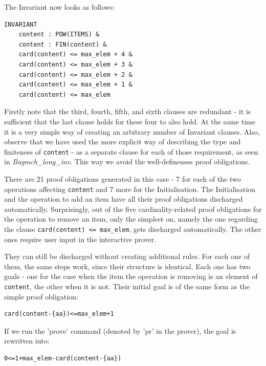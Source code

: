 \documentclass[11pt,journal]{IEEEtran}
\begin{document}
	The Invariant now looks as follows:
	\begin{lstlisting}
INVARIANT
	content : POW(ITEMS) & 
	content : FIN(content) &
	card(content) <= max_elem + 4 &
	card(content) <= max_elem + 3 &
	card(content) <= max_elem + 2 &
	card(content) <= max_elem + 1 &
	card(content) <= max_elem
	\end{lstlisting}
	Firstly note that the third, fourth, fifth, and sixth clauses are redundant - it is sufficient that the last clause holds for these four to also hold. At the same time it is a very simple way of creating an arbitrary number of Invariant clauses. Also, observe that we have used the more explicit way of describing the type and finiteness of \texttt{content} - as a separate clause for each of those requirement, as seen in \emph{Bagmch\_long\_inv}. This way we avoid the well-defineness proof obligations.
	
	There are 21 proof obligations generated in this case - 7 for each of the two operations affecting \texttt{content} and 7 more for the Initialisation. The Initialisation and the operation to add an item have all their proof obligations discharged automatically. Surprisingly, out of the five cardinality-related proof obligations for the operation to remove an item, only the simplest on, namely the one regarding the clause \texttt{card(content) <= max\_elem}, gets discharged automatically. The other ones require user input in the interactive prover. 
	
	They can still be discharged without creating additional rules. For each one of them, the same steps work, since their structure is identical. Each one has two goals - one for the case when the item the operation is removing is an element of \texttt{content}, the other when it is not. Their initial goal is of the same form as the simple proof obligation:
	\begin{lstlisting}
card(content-{aa})<=max_elem+1 
	\end{lstlisting}
	If we run the 'prove' command (denoted by 'pr' in the prover), the goal is rewritten into:
	\begin{lstlisting}
0<=1+max_elem-card(content-{aa}) 
	\end{lstlisting}
	
\end{document}
